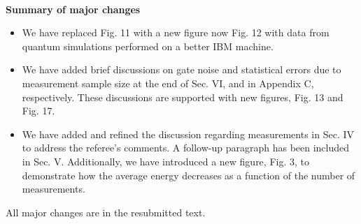 \documentclass[groupedaddress,prx,floats,superscriptaddress,notitlepages,12pt]{revtex4-2}
\begin{document}
\noindent\\[4ex] \textbf{Summary of major changes}\\

\begin{itemize}
    \item We have replaced Fig. 11 with a new figure now Fig. 12 with data from quantum simulations performed on a better IBM machine. 
    
    \item We have added brief discussions on gate noise and statistical errors due to measurement sample size at the end of Sec. VI, and in Appendix C, respectively. These discussions are supported with new figures, Fig. 13 and Fig. 17.

    \item We have added and refined the discussion regarding measurements in Sec. IV to address the referee's comments. A follow-up paragraph has been included in Sec. V. Additionally, we have introduced a new figure, Fig. 3, to demonstrate how the average energy decreases as a function of the number of measurements.








    
\end{itemize}

\noindent
All major changes are 
%
in the resubmitted text. 


\end{document}

